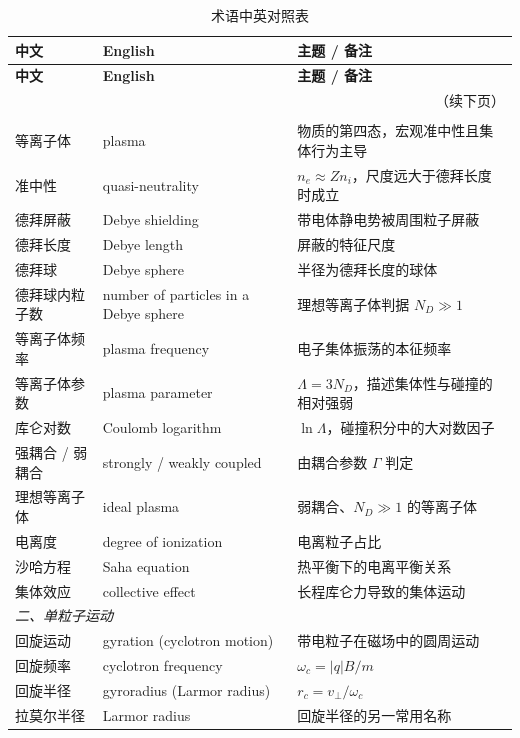\documentclass[12pt,a4paper,openany,oneside]{book}
\begin{document}
{\scriptsize
\setlength{\tabcolsep}{3pt}
\renewcommand{\arraystretch}{0.85}
\begin{longtable}{@{}p{4.2cm}p{5.6cm}p{4.8cm}@{}}
\caption{术语中英对照表}
\label{tab:terms}\\
\toprule
\textbf{中文} & \textbf{English} & \textbf{主题 / 备注} \\
\midrule
\endfirsthead
\toprule
\textbf{中文} & \textbf{English} & \textbf{主题 / 备注} \\
\midrule
\endhead
\midrule
\multicolumn{3}{r}{\small（续下页）} \\
\endfoot
\bottomrule
\endlastfoot
\multicolumn{3}{l}{\textit{一、基本概念}} \\
\midrule
等离子体 & plasma & 物质的第四态，宏观准中性且集体行为主导 \\
准中性 & quasi-neutrality & $n_e \approx Zn_i$，尺度远大于德拜长度时成立 \\
德拜屏蔽 & Debye shielding & 带电体静电势被周围粒子屏蔽 \\
德拜长度 & Debye length & 屏蔽的特征尺度 \\
德拜球 & Debye sphere & 半径为德拜长度的球体 \\
德拜球内粒子数 & number of particles in a Debye sphere & 理想等离子体判据 $N_D \gg 1$ \\
等离子体频率 & plasma frequency & 电子集体振荡的本征频率 \\
等离子体参数 & plasma parameter & $\Lambda = 3N_D$，描述集体性与碰撞的相对强弱 \\
库仑对数 & Coulomb logarithm & $\ln\Lambda$，碰撞积分中的大对数因子 \\
强耦合 / 弱耦合 & strongly / weakly coupled & 由耦合参数 $\Gamma$ 判定 \\
理想等离子体 & ideal plasma & 弱耦合、$N_D\gg1$ 的等离子体 \\
电离度 & degree of ionization & 电离粒子占比 \\
沙哈方程 & Saha equation & 热平衡下的电离平衡关系 \\
集体效应 & collective effect & 长程库仑力导致的集体运动 \\
\multicolumn{3}{l}{\textit{二、单粒子运动}} \\
\midrule
回旋运动 & gyration (cyclotron motion) & 带电粒子在磁场中的圆周运动 \\
回旋频率 & cyclotron frequency & $\omega_c = |q|B/m$ \\
回旋半径 & gyroradius (Larmor radius) & $r_c = v_\perp/\omega_c$ \\
拉莫尔半径 & Larmor radius & 回旋半径的另一常用名称 \\

\end{longtable}}
\end{document}
